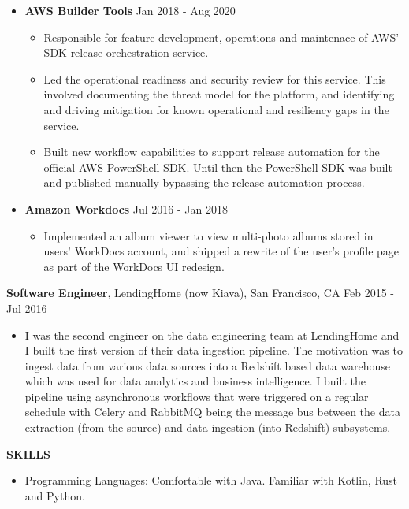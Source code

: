 \documentclass[10pt, letterpaper]{article}
\begin{document}
\begin{itemize}
\begin{itemize}[label=$\bullet$]
  \end{itemize}
\item \textbf{AWS Builder Tools} \hfill Jan 2018 - Aug 2020
  \begin{itemize}[label=$\bullet$]
    \item Responsible for feature development, operations and maintenace of AWS' SDK release orchestration service.
    \item Led the operational readiness and security review for this service. This involved documenting the threat model
      for the platform, and identifying and driving mitigation for known operational and resiliency gaps in the service. 
    \item Built new workflow capabilities to support release automation for the official AWS PowerShell SDK. Until then
      the PowerShell SDK was built and published manually bypassing the release automation process.
  \end{itemize}
\item \textbf{Amazon Workdocs} \hfill Jul 2016 - Jan 2018
  \begin{itemize}[label=$\bullet$]
    \item Implemented an album viewer to view multi-photo albums stored in users' WorkDocs account, and shipped a rewrite 
      of the user's profile page as part of the WorkDocs UI redesign.
  \end{itemize}
\end{itemize}
\textbf{Software Engineer}, LendingHome (now Kiava), San Francisco, CA \hfill Feb 2015 - Jul 2016
  \begin{itemize}
    \item I was the second engineer on the data engineering team at LendingHome and I built the first version of their data ingestion pipeline.
      The motivation was to ingest data from various data sources into a Redshift based data warehouse which was used for data analytics and business
      intelligence. I built the pipeline using asynchronous workflows that were triggered on a regular schedule with Celery and RabbitMQ being the message
      bus between the data extraction (from the source) and data ingestion (into Redshift) subsystems.
  \end{itemize}

\textbf{SKILLS}
\smallskip 
\begin{itemize}
\item Programming Languages: Comfortable with Java. Familiar with Kotlin, Rust and Python.
\end{itemize} 
\end{document}
